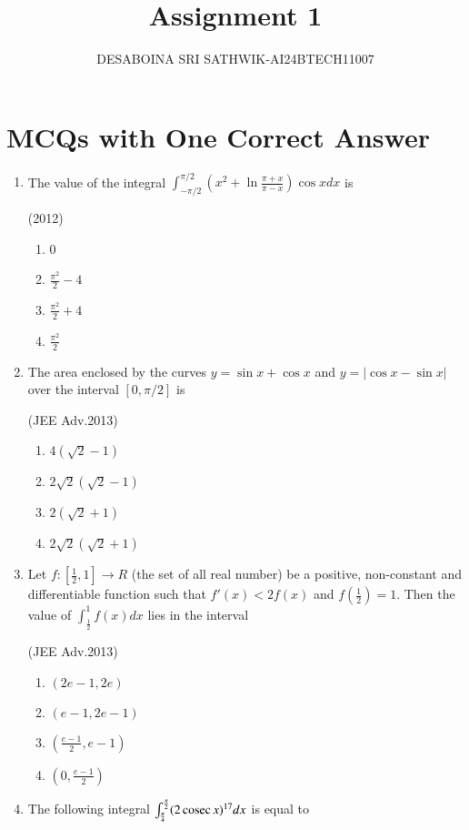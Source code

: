 \documentclass[journal,12pt,twocolumn]{IEEEtran}
\theoremstyle{remark}
\begin{document}

\vspace{3cm}

\title{Assignment 1}
\author{DESABOINA SRI SATHWIK-AI24BTECH11007}
\maketitle
\newpage
\bigskip

\renewcommand{\thefigure}{\theenumi}
\renewcommand{\thetable}{\theenumi}
\section*{MCQs with One Correct Answer}
\begin{enumerate}
\item
The value of the integral $\int_{-\pi/2}^{\pi/2}(x^2+\ln\frac{\pi+x}{\pi-x})\cos xdx$ is

	\hfill{(2012)}
		\begin{multicols}{4}
                \begin{enumerate}
        \item 0
        \item $\frac{\pi^2}{2}-4$
        \item $\frac{\pi^2}{2}+4$
        \item $\frac{\pi^2}{2}$
                \end{enumerate}
		\end{multicols}
\item
The area enclosed by the curves $y=\sin x+\cos x$ and $y=|\cos x-\sin x|$ over the interval $[0,\pi/2]$ is

		\hfill{(JEE Adv.2013)}
		\begin{multicols}{2}
		\begin{enumerate}
			\item $4(\sqrt{2}-1)$
			\item $2\sqrt{2}(\sqrt{2}-1)$
			\item $2(\sqrt{2}+1)$
			\item $2\sqrt{2}(\sqrt{2}+1)$
		\end{enumerate}
		\end{multicols}
	\item
		Let $f:[\frac{1}{2},1]\rightarrow R$ (the set of all real number) be a positive, non-constant and differentiable function such that $f'(x)<2f(x)$ and $f(\frac{1}{2})=1$. Then the value of $\int_{\frac{1}{2}}^{1}f(x) dx $ lies in the interval  

		\hfill{(JEE Adv.2013)}
		\begin{multicols}{2}
		\begin{enumerate}
			\item $(2e-1,2e)$
			\item $(e-1,2e-1)$
			\item $(\frac{e-1}{2},e-1)$
			\item $(0,\frac{e-1}{2})$
		\end{enumerate}
		\end{multicols}
	\item
		The following integral $\int_{\frac{\pi}{4}}^{\frac{\pi}{2}}(2\,\text{cosec}\, x)^{17}dx$ is equal to


\end{enumerate}
\end{document}
